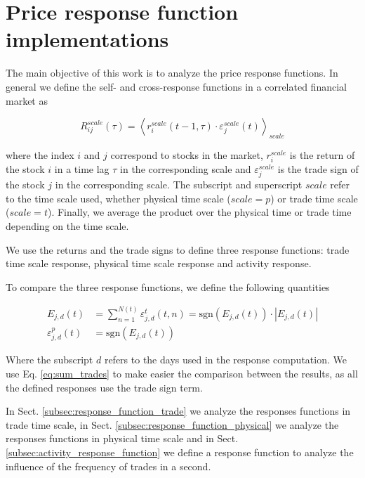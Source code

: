 \section{Price response function implementations}
\label{sec:response_functions_imp}

The main objective of this work is to analyze the price response functions. In
general we define the self- and cross-response functions in a correlated
financial market as

\begin{equation}\label{eq:response_general}
    R^{scale}_{ij}\left(\tau\right)=\left\langle r^{scale}_{i}\left(t-1,
    \tau\right) \cdot\varepsilon^{scale}_{j} \left(t\right)\right\rangle
    _{scale}
\end{equation}

where the index $i$ and $j$ correspond to stocks in the market,
$r^{scale}_{i}$ is the return of the stock $i$ in a time lag $\tau$ in the
corresponding scale and $\varepsilon^{scale}_{j}$ is the trade sign of the
stock $j$ in the corresponding scale. The subscript and superscript $scale$
refer to the time scale used, whether physical time scale ($scale = p$) or
trade time scale ($scale = t$). Finally, we average the product over the
physical time or trade time depending on the time scale.

We use the returns and the trade signs to define three response functions:
trade time scale response, physical time scale response and activity response.

To compare the three response functions, we define the following quantities

\begin{align}
    E_{j,d}\left(t\right)&=\sum_{n=1}^{N\left(t\right)}
    \varepsilon_{j,d}^{t}\left(t,n\right) =
    \text{sgn}\left(E_{j,d}\left(t\right)\right)
    \cdot\left|E_{j,d}\left(t\right)\right|\label{eq:sum_trades}\\
    \varepsilon_{j,d}^{p}\left(t\right)&=
    \text{sgn}\left(E_{j,d}\left(t\right)\right)\label{eq:sign_sum_trades}
\end{align}

Where the subscript $d$ refers to the days used in the response computation.
We use Eq. \ref{eq:sum_trades} to make easier the comparison between the
results, as all the defined responses use the trade sign term.

In Sect. \ref{subsec:response_function_trade} we analyze the responses
functions in trade time scale, in Sect. \ref{subsec:response_function_physical}
we analyze the responses functions in physical time scale and in Sect.
\ref{subsec:activity_response_function} we define a response function to
analyze the influence of the frequency of trades in a second.

